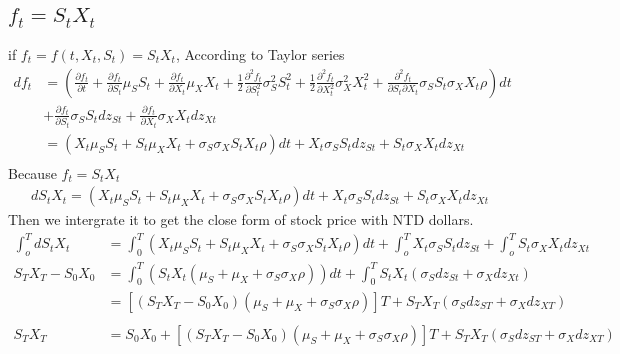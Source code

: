 \documentclass[12pt]{article}
\begin{document}
\subsection{$f_t = S_t X_t$}
if $f_t = f(t, X_t, S_t) = S_t X_t$, According to Taylor series
\begin{align*}
    df_t &= (\frac{\partial f_t}{\partial t} + \frac{\partial f_t}{\partial S_t}\mu_S S_t + \frac{\partial f_t}{\partial X_t}\mu_X X_t + \frac{1}{2}\frac{\partial^2 f_t}{\partial S_t^2}\sigma^2_S S_t^2 + \frac{1}{2}\frac{\partial^2 f_t}{\partial X_t^2}\sigma^2_X X_t^2 + \frac{\partial^2 f_t}{\partial S_t \partial X_t}\sigma_S S_t \sigma_X X_t \rho)dt \\
    &+ \frac{\partial f_t}{\partial S_t}\sigma_S S_t dz_{St} + \frac{\partial f_t}{\partial X_t}\sigma_X X_t dz_{Xt}\\
    &= (X_t\mu_S S_t + S_t \mu_X X_t + \sigma_S\sigma_X S_t X_t\rho)dt + X_t \sigma_S S_t dz_{St} + S_t \sigma_X X_t dz_{Xt}\\
\end{align*}
Because $f_t = S_t X_t$
\begin{align*}
    dS_t X_t = (X_t\mu_S S_t + S_t \mu_X X_t + \sigma_S\sigma_X S_t X_t\rho)dt + X_t \sigma_S S_t dz_{St} + S_t \sigma_X X_t dz_{Xt} 
\end{align*}
Then we intergrate it to get the close form of stock price with NTD dollars.
\begin{align*}
    \int_o^T dS_t X_t &= \int_0^T (X_t\mu_S S_t + S_t \mu_X X_t + \sigma_S\sigma_X S_t X_t\rho)dt + \int_o^T X_t \sigma_S S_t dz_{St} + \int_o^T S_t \sigma_X X_t dz_{Xt}\\
    S_T X_T-S_0 X_0 &= \int_0^T(S_t X_t(\mu_S + \mu_X+\sigma_S\sigma_X\rho))dt + \int_0^T S_t X_t(\sigma_S dz_{St} + \sigma_X dz_{Xt})\\
    &= [(S_T X_T - S_0 X_0)(\mu_S + \mu_X+\sigma_S\sigma_X\rho)]T + S_T X_T(\sigma_S dz_{ST} + \sigma_X dz_{XT})\\\\
    S_T X_T &= S_0 X_0 + [(S_T X_T - S_0 X_0)(\mu_S + \mu_X+\sigma_S\sigma_X\rho)]T + S_T X_T(\sigma_S dz_{ST} + \sigma_X dz_{XT})
\end{align*}
\end{document}
